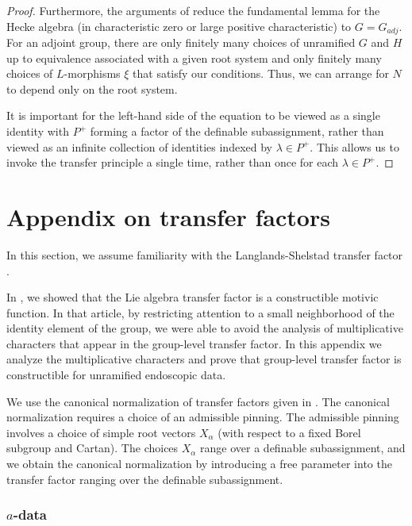 \begin{proof}
Furthermore, the arguments of \cite{hales1995fundamental} reduce the
fundamental lemma for the Hecke algebra (in characteristic zero or
large positive characteristic) to $G = G_{adj}$.  For an adjoint
group, there are only finitely many choices of unramified $G$ and $H$
up to equivalence associated with a given root system and only
finitely many choices of $L$-morphisms $\xi$ that satisfy our
conditions.  Thus, we can arrange for $N$ to depend only on the root
system.

It is important for the left-hand side of the equation to be viewed as
a single identity with $P^+$ forming a factor of the definable
subassignment, rather than viewed as an infinite collection of
identities indexed by $\lambda\in P^+$.  This allows us to invoke the
transfer principle a single time, rather than once for each
$\lambda\in P^+$.
\end{proof}

\section{Appendix on transfer factors}\label{sec:xfer}

In this section, we assume familiarity with the Langlands-Shelstad
transfer factor \cite{langlands1987definition}.

In \cite{gordon}, we showed that the Lie algebra transfer factor is a
constructible motivic function.  In that article, by restricting
attention to a small neighborhood of the identity element of the
group, we were able to avoid the analysis of multiplicative characters
that appear in the group-level transfer factor.  In this appendix we
analyze the multiplicative characters and prove that group-level
transfer factor is constructible for unramified endoscopic data.

We use the canonical normalization of transfer factors given in
\cite[\S7]{hales1993simple}.  The canonical normalization requires
a choice of an admissible pinning.  The admissible pinning involves a
choice of simple root vectors $X_\alpha$ (with respect to a fixed Borel subgroup
and Cartan).  The choices $X_\alpha$ range over a definable
subassignment, and we obtain the canonical normalization by
introducing a free parameter into the transfer factor ranging over the
definable subassignment.

\subsubsection{$a$-data}


